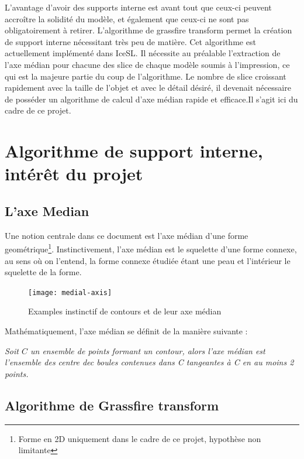 \documentclass[11pt]{article}
\begin{document}
L'avantage d'avoir des supports interne est avant tout que ceux-ci peuvent accroître la solidité du modèle, et également que ceux-ci ne sont pas obligatoirement à retirer. L'algorithme de grassfire transform permet la création de support interne nécessitant très peu de matière. Cet algorithme est actuellement implémenté dans IceSL. Il nécessite au préalable l'extraction de l'axe médian pour chacune des slice de chaque modèle soumis à l'impression, ce qui est la majeure partie du coup de l'algorithme. Le nombre de slice croissant rapidement avec la taille de l'objet et avec le détail désiré, il devenait nécessaire de posséder un algorithme de calcul d'axe médian rapide et efficace.Il s'agit ici du cadre de ce projet.


\section{Algorithme de support interne, intérêt du projet}

\subsection{L'axe Median}

Une notion centrale dans ce document est l'axe médian d'une forme geométrique\footnote{Forme en 2D uniquement dans le cadre de ce projet, hypothèse non limitante}. Instinctivement, l'axe médian est le squelette d'une forme connexe, au sens où on l'entend, la forme connexe étudiée étant une peau et l'intérieur le squelette de la forme.

\begin{figure}[h]
\centering
\texttt{[image: medial-axis]}
\caption{Examples instinctif de contours et de leur axe médian}
\end{figure}

Mathématiquement, l'axe médian se définit de la manière suivante :
\vspace{5mm}
\begin{changemargin}{2cm}{2cm}
\it Soit $C$ un ensemble de points formant un contour, alors l'axe médian est l'ensemble des centre dec boules contenues dans C tangeantes à C en au moins 2 points.

\end{changemargin} 

\subsection{Algorithme de Grassfire transform}
\end{document}
